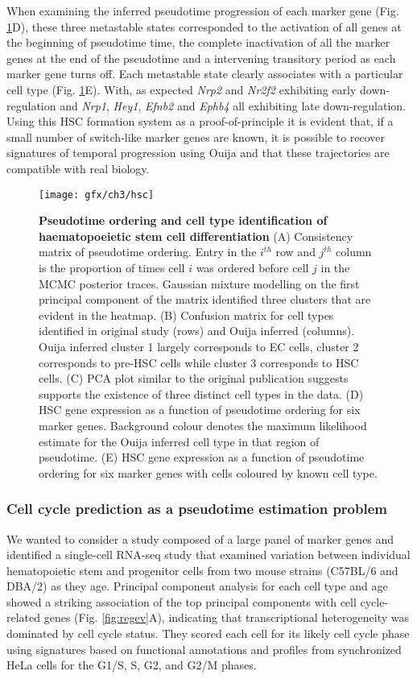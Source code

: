 When examining the inferred pseudotime progression of each marker gene (Fig. \ref{fig:hsc}D), these three metastable states corresponded to the activation of all genes at the beginning of pseudotime time, the complete inactivation of all the marker genes at the end of the pseudotime and a intervening transitory period as each marker gene turns off. Each metastable state clearly associates with a particular cell type (Fig. \ref{fig:hsc}E). With, as expected \emph{Nrp2} and \emph{Nr2f2} exhibiting early down-regulation and \emph{Nrp1}, \emph{Hey1}, \emph{Efnb2} and \emph{Ephb4} all exhibiting late down-regulation. Using this HSC formation system as a proof-of-principle it is evident that, if a small number of switch-like marker genes are known, it is possible to recover signatures of temporal progression using Ouija and that these trajectories are compatible with real biology.

\begin{figure}[!t]
	\centering
	\texttt{[image: gfx/ch3/hsc]}
	\caption{{\bf Pseudotime ordering and cell type identification of haematopoeietic stem cell differentiation}
(A) Consistency matrix of pseudotime ordering. Entry in the $i^{th}$ row and $j^{th}$ column is the proportion of times cell $i$ was ordered before cell $j$ in the MCMC posterior traces. Gaussian mixture modelling on the first principal component of the matrix identified three clusters that are evident in the heatmap.
(B) Confusion matrix for cell types identified in original study (rows) and Ouija inferred (columns). Ouija inferred cluster 1 largely corresponds to EC cells, cluster 2 corresponds to pre-HSC cells while cluster 3 corresponds to HSC cells.
(C) PCA plot similar to the original publication \cite{zhou2016tracing} suggests supports the existence of three distinct cell types in the data.
(D) HSC gene expression as a function of pseudotime ordering for six marker genes. Background colour denotes the maximum likelihood estimate for the Ouija inferred cell type in that region of pseudotime.
(E) HSC gene expression as a function of pseudotime ordering for six marker genes with cells coloured by known cell type.
}
	\label{fig:hsc}
\end{figure}


\subsubsection{Cell cycle prediction as a pseudotime estimation problem}

We wanted to consider a study composed of a large panel of marker genes and identified a single-cell RNA-seq study \cite{kowalczyk2015single} that examined variation between individual hematopoietic stem and progenitor cells from two mouse strains (C57BL/6 and DBA/2) as they age. Principal component analysis for each cell type and age showed a striking association of the top principal components with cell cycle-related genes (Fig. \ref{fig:regev}A), indicating that transcriptional heterogeneity was dominated by cell cycle status. They scored each cell for its likely cell cycle phase using signatures based on functional annotations \cite{reference2009gene} and profiles from synchronized HeLa cells\cite{whitfield2002identification} for the G1/S, S, G2, and G2/M phases.

